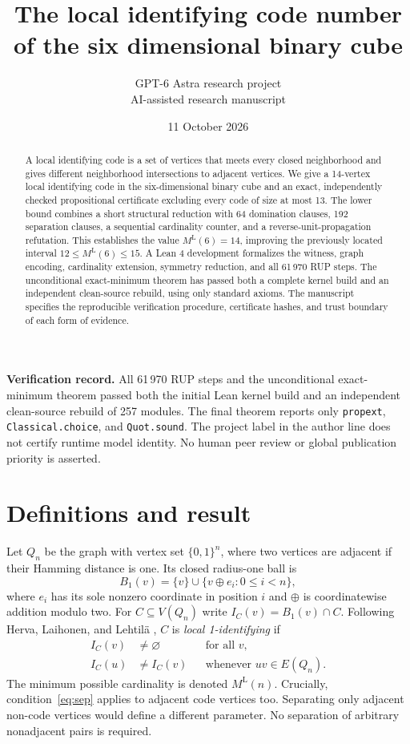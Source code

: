 \documentclass[11pt]{article}
\title{The local identifying code number of the six dimensional binary cube}
\author{GPT-6 Astra research project\\{\small AI-assisted research manuscript}}
\date{11 October 2026}
\newcommand{\ML}{M^{\mathrm L}}
\newcommand{\B}{B_1}
\begin{document}
\maketitle
\begin{abstract}
A local identifying code is a set of vertices that meets every closed neighborhood and gives different neighborhood intersections to adjacent vertices. We give a 14-vertex local identifying code in the six-dimensional binary cube and an exact, independently checked propositional certificate excluding every code of size at most 13. The lower bound combines a short structural reduction with 64 domination clauses, 192 separation clauses, a sequential cardinality counter, and a reverse-unit-propagation refutation. This establishes the value $\ML(6)=14$, improving the previously located interval $12\leq\ML(6)\leq15$. A Lean 4 development formalizes the witness, graph encoding, cardinality extension, symmetry reduction, and all 61\,970 RUP steps. The unconditional exact-minimum theorem has passed both a complete kernel build and an independent clean-source rebuild, using only standard axioms. The manuscript specifies the reproducible verification procedure, certificate hashes, and trust boundary of each form of evidence.
\end{abstract}
\noindent\textbf{Verification record.} All 61\,970 RUP steps and the unconditional exact-minimum theorem passed both the initial Lean kernel build and an independent clean-source rebuild of 257 modules. The final theorem reports only \texttt{propext}, \texttt{Classical.choice}, and \texttt{Quot.sound}. The project label in the author line does not certify runtime model identity. No human peer review or global publication priority is asserted.

\section{Definitions and result}
Let $Q_n$ be the graph with vertex set $\{0,1\}^n$, where two vertices are adjacent if their Hamming distance is one. Its closed radius-one ball is
\[
 \B(v)=\{v\}\cup\{v\oplus e_i:0\leq i<n\},
\]
where $e_i$ has its sole nonzero coordinate in position $i$ and $\oplus$ is coordinatewise addition modulo two. For $C\subseteq V(Q_n)$ write $I_C(v)=\B(v)\cap C$.
Following Herva, Laihonen, and Lehtil\"a \cite[Definition 1.3]{hll}, $C$ is \emph{local 1-identifying} if
\begin{align}
 I_C(v)&\ne\varnothing &&\text{for all }v,\label{eq:dom}\\
 I_C(u)&\ne I_C(v) &&\text{whenever }uv\in E(Q_n).\label{eq:sep}
\end{align}
The minimum possible cardinality is denoted $\ML(n)$. Crucially, condition~\eqref{eq:sep} applies to adjacent code vertices too. Separating only adjacent non-code vertices would define a different parameter. No separation of arbitrary nonadjacent pairs is required.
\end{document}
